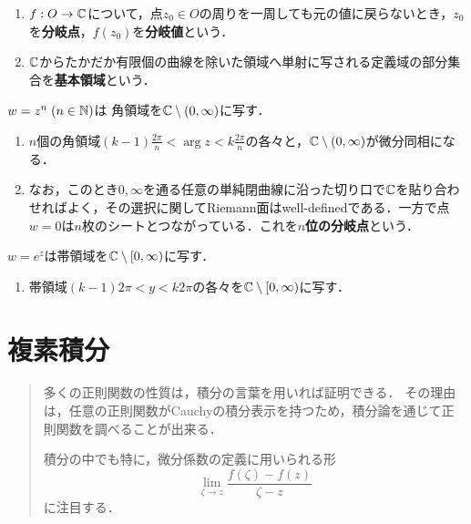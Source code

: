 \documentclass[uplatex, dvipdfmx]{jsreport}
\begin{document}
\begin{definition}\mbox{}
    \begin{enumerate}
        \item $f:O\to\mathbb{C}$について，点$z_0\in O$の周りを一周しても元の値に戻らないとき，$z_0$を\textbf{分岐点}，$f(z_0)$を\textbf{分岐値}という．
        \item $\mathbb{C}$からたかだか有限個の曲線を除いた領域へ単射に写される定義域の部分集合を\textbf{基本領域}という．
    \end{enumerate}
\end{definition}

\begin{example}[多項式]
    $w=z^n\;(n\in\mathbb{N})$は
    角領域を$\mathbb{C}\setminus(0,\infty)$に写す．
    \begin{enumerate}
        \item $n$個の角領域$(k-1)\frac{2\pi}{n}<\arg z<k\frac{2\pi}{n}$の各々と，$\mathbb{C}\setminus(0,\infty)$が微分同相になる．
        \item なお，このとき$0,\infty$を通る任意の単純閉曲線に沿った切り口で$\mathbb{C}$を貼り合わせればよく，その選択に関してRiemann面はwell-definedである．一方で点$w=0$は$n$枚のシートとつながっている．これを\textbf{$n$位の分岐点}という．
    \end{enumerate}
\end{example}

\begin{example}[指数関数]
    $w=e^z$は帯領域を$\mathbb{C}\setminus[0,\infty)$に写す．
    \begin{enumerate}
        \item 帯領域$(k-1)2\pi<y<k2\pi$の各々を$\mathbb{C}\setminus[0,\infty)$に写す．
    \end{enumerate}
\end{example}

\chapter{複素積分}

\begin{quotation}
    多くの正則関数の性質は，積分の言葉を用いれば証明できる．
    その理由は，任意の正則関数がCauchyの積分表示を持つため，積分論を通じて正則関数を調べることが出来る．

    積分の中でも特に，微分係数の定義に用いられる形
    \[\lim_{\zeta\to z}\frac{f(\zeta)-f(z)}{\zeta-z}\]
    に注目する．
\end{quotation}
\end{document}
